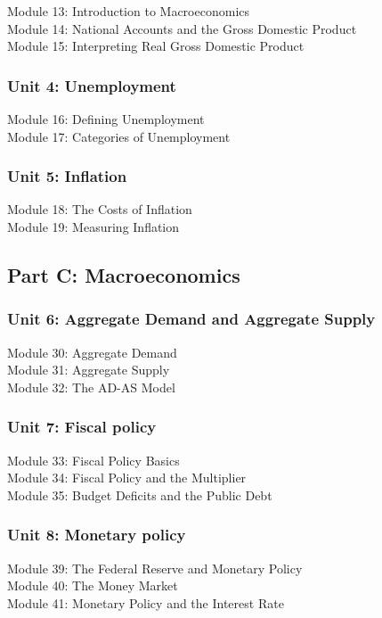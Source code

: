 \documentclass[
    letterpaper,paper=portrait,fleqn,
    DIV=16,fontsize=11pt,twoside=semi,
    parskip=full-,
    headings=standardclasses]
{scrartcl}
\begin{document}
Module 13: Introduction to Macroeconomics \\
Module 14: National Accounts and the Gross Domestic Product \\
Module 15: Interpreting Real Gross Domestic Product

\subsubsection*{Unit 4: Unemployment}

Module 16: Defining Unemployment \\
Module 17: Categories of Unemployment

\subsubsection*{Unit 5: Inflation}

Module 18: The Costs of Inflation \\
Module 19: Measuring Inflation

\subsection*{Part C: Macroeconomics}

\subsubsection*{Unit 6: Aggregate Demand and Aggregate Supply}

Module 30: Aggregate Demand \\
Module 31: Aggregate Supply \\
Module 32: The AD-AS Model

\subsubsection*{Unit 7: Fiscal policy}

Module 33: Fiscal Policy Basics \\
Module 34: Fiscal Policy and the Multiplier \\
Module 35: Budget Deficits and the Public Debt

\subsubsection*{Unit 8: Monetary policy}

Module 39: The Federal Reserve and Monetary Policy \\
Module 40: The Money Market \\
Module 41: Monetary Policy and the Interest Rate
\end{document}
